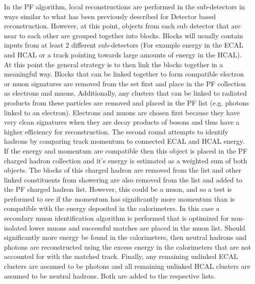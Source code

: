 	In the PF algorithm, local reconstructions are performed in the sub-detectors in ways similar to what has been previously described for Detector based reconstruction. However, at this point, objects from each sub detector that are near to each other are grouped together into blocks. Blocks will usually contain inputs from at least 2 different sub-detectors (For example energy in the ECAL and HCAL or a track pointing towards large amounts of energy in the HCAL). At this point the general strategy is to then link the blocks together in a meaningful way. Blocks that can be linked together to form compatible electron or muon signatures are removed from the set first and place in the PF collection as electrons and muons. Additionally, any clusters that can be linked to radiated products from these particles are removed and placed in the PF list (e.g. photons linked to an electron). Electrons and muons are chosen first because they have very clean signatures when they are decay products of bosons and thus have a higher efficiency for reconstruction. The second round attempts to identify hadrons by comparing track momentum to connected ECAL and HCAL energy. If the energy and momentum are compatible then this object is placed in the PF charged hadron collection and it's energy is estimated as a weighted sum of both objects. The blocks of this charged hadron are removed from the list and other linked constituents from showering are also removed from the list and added to the PF charged hadron list. However, this could be a muon, and so a test is performed to see if the momentum has significantly more momentum than is compatible with the energy deposited in the calorimeters. In this case a secondary muon identification algorithm is performed that is optimized for non-isolated lower \pt muons and successful matches are placed in the muon list. Should significantly more energy be found in the calorimeters, then neutral hadrons and photons are reconstructed using the excess energy in the calorimeters that are not accounted for with the matched track. Finally, any remaining unlinked ECAL clusters are assumed to be photons and all remaining unlinked HCAL clusters are assumed to be neutral hadrons. Both are added to the respective lists.\\
	
	
	
	
	
